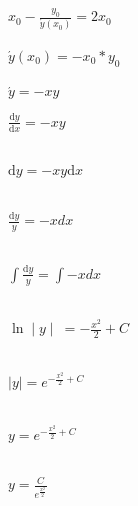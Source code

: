 \documentclass{article}
\begin{document}
$x_0 - \frac{y_0}{\acute{y}(x_0)} = 2x_0$\\\\

$\acute{y}(x_0) = -x_0 * y_0$\\\\

$\acute{y} = -xy$

\begin{center}
\end{center}

\begin{flushleft}
    $\frac{\text{d}y}{\text{d}x} = -xy$\\\\
\end{flushleft}

\begin{flushleft}
    $\text{d}y = -xy\text{d}x$\\\\
\end{flushleft}

\begin{flushleft}
    $\frac{\text{d}y}y = -xdx$\\\\
\end{flushleft}

\begin{flushleft}
    $\int{\frac{\text{d}y}y} = \int-xdx$\\\\
\end{flushleft}

\begin{flushleft}
    $\ln\mid y\mid\ = -\frac{x^{2}}{2}+C$\\\\
\end{flushleft}

\begin{flushleft}
    $|y| = e^{-\frac{x^2}{2} + C}$\\\\
\end{flushleft}

\begin{flushleft}
    $y = e^{-\frac{x^2}{2} + C}$\\\\
\end{flushleft}

\begin{flushleft}
    $y = \frac{C}{e^{\frac{x^2}{2}}}$\\\\
\end{flushleft}
\end{document}
